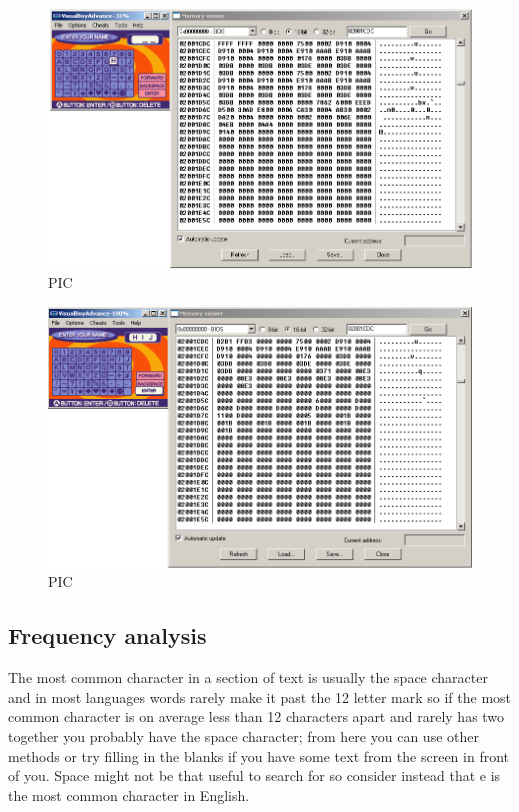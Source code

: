 \documentclass[
]{book}
\begin{document}
\begin{figure}
\centering
\includegraphics{images/93_home_fast6191_romhackingguide_unrenamed_file___inal_borders_romhackguidetextmemoryviewing1.png}
\caption{PIC}
\end{figure}

\begin{figure}
\centering
\includegraphics{images/94_home_fast6191_romhackingguide_unrenamed_file___inal_borders_romhackguidetextmemoryviewing2.png}
\caption{PIC}
\end{figure}

\hypertarget{frequency-analysis}{%
\subsection{Frequency analysis}\label{frequency-analysis}}

The most common character in a section of text is usually the space character and in most languages words rarely make it past the 12 letter mark so if the most common character is on average less than 12 characters apart and rarely has two together you probably have the space character; from here you can use other methods or try filling in the blanks if you have some text from the screen in front of you. Space might not be that useful to search for so consider instead that e is the most common character in English.
\end{document}
